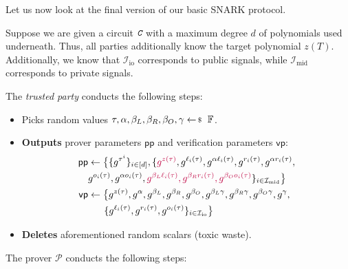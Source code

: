 \documentclass[../../book.tex]{subfiles}
\begin{document}
Let us now look at the final version of our basic SNARK protocol.

\begin{tcolorbox}[title=Attempt \#5: Turning SNARK into zk-SNARK,
    breakable,
    colback=blue!5!white,
    colframe=blue!75!black,
    colbacktitle=blue!25!white,
    coltitle=blue!20!black,
    fonttitle=\bfseries,
    boxrule=1.25pt,
    subtitle style={boxrule=0pt,
    colback=blue!20!white,
    colupper=blue!75!gray} ]
    \small
    Suppose we are given a circuit $\textit{\texttt{C}}$ with a maximum degree $d$ of polynomials used underneath. Thus, all parties additionally know the target polynomial $z(T)$. Additionally, we know that $\mathcal{I}_{\text{io}}$ corresponds to public signals, while $\mathcal{I}_{\text{mid}}$ corresponds to private signals.

    The \emph{trusted party} conducts the following steps:
    \begin{itemize}[label=]
        \item Picks random values $\tau, \alpha, \beta_L, \beta_R, \beta_O, \gamma \leftarrowS \mathbb{F}$.
        \item \textbf{Outputs} prover parameters $\mathsf{pp}$ and verification parameters $\mathsf{vp}$:
        \begin{align*}
            \mathsf{pp} &\gets \big\{\{g^{\tau^i}\}_{i \in [d]}, \{\textcolor{purple}{g^{z(\tau)}}, g^{\ell_i(\tau)}, g^{\alpha \ell_i(\tau)}, g^{r_i(\tau)}, g^{\alpha r_i(\tau)}, \\ 
                        & g^{o_i(\tau)}, g^{\alpha o_i(\tau)}, \textcolor{purple}{g^{\beta_L\ell_i(\tau)}, g^{\beta_Rr_i(\tau)}, g^{\beta_Oo_i(\tau)}}\}_{i \in \mathcal{I}_{\text{mid}}}\big\} \\
            \mathsf{vp} &\gets \big\{ g^{z(\tau)}, g^{\alpha}, g^{\beta_L}, g^{\beta_R}, g^{\beta_O}, g^{\beta_L\gamma}, g^{\beta_R\gamma}, g^{\beta_O\gamma}, g^{\gamma}, \\
                        & \;\;\;\;\;\; \{g^{\ell_i(\tau)}, g^{r_i(\tau)}, g^{o_i(\tau)}\}_{i \in \mathcal{I}_{\text{io}}} \big\}
        \end{align*}
        \item \textbf{Deletes} aforementioned random scalars (toxic waste).
    \end{itemize}
    The prover $\mathcal{P}$ conducts the following steps:
    \begin{itemize}[label=]

\end{itemize}
\end{tcolorbox}
\end{document}
